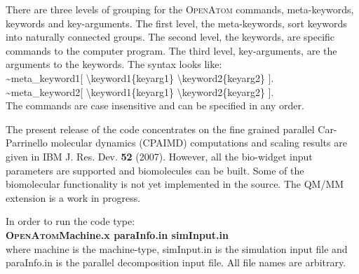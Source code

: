 \documentclass[12pt,titlepage]{article}
\begin{document}
There are three levels of grouping for the \textsc{OpenAtom} commands, 
meta-keywords, keywords and key-arguments.
The first level, the meta-keywords, sort keywords into naturally
connected groups. The second level, the keywords, are specific
commands to the computer program. The third level, key-arguments,
are the arguments to the keywords.  The syntax looks like: \\ 
\hspace*{0.5in} \~{}meta\_keyword1[ \textbackslash{}keyword1\{keyarg1\}
\textbackslash{}keyword2\{keyarg2\} ]. \\
\hspace*{0.5in} \~{}meta\_keyword2[ \textbackslash{}keyword1\{keyarg1\}
\textbackslash{}keyword2\{keyarg2\} ]. \\
The commands are case insensitive and can be specified in any order.

The present release of the code concentrates on the fine grained
parallel Car-Parrinello molecular dynamics (CPAIMD) computations 
and scaling results are given in IBM J. Res. Dev. {\bf 52} (2007). 
However, all the 
bio-widget input parameters are supported and biomolecules can be
built. Some of the biomolecular functionality is not yet implemented
in the source. The QM/MM extension is a work in progress.

In order to run the code type: \\
\hspace*{1.5in} {\bf \textsc{OpenAtom}Machine.x paraInfo.in simInput.in} \\
where machine is the machine-type, simInput.in is the simulation input
file and paraInfo.in is the parallel decomposition input file. 
All file names are arbitrary.
\end{document}
